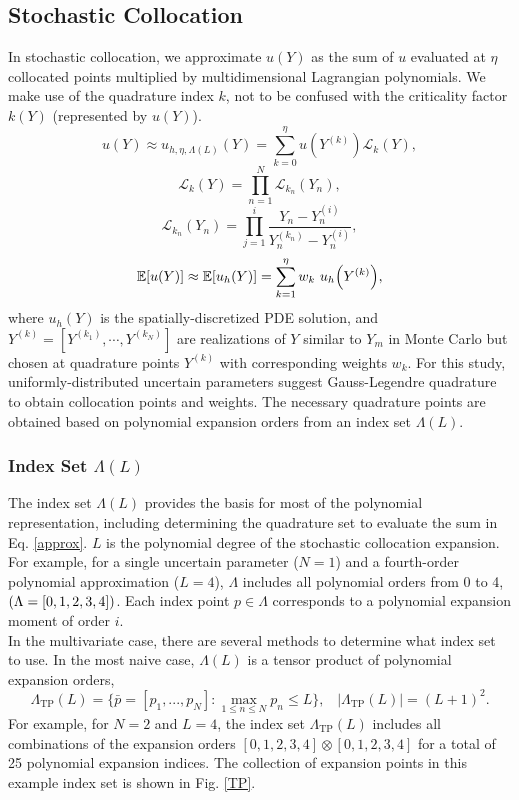 \documentclass{mc2015}
\newcommand{\expv}[1]{\ensuremath{\mathbb{E}[ #1]}}
\begin{document}
\subsection{Stochastic Collocation}
In stochastic collocation, we approximate $u(Y)$ as the sum of $u$ evaluated at $\eta$ collocated points multiplied by multidimensional Lagrangian polynomials.  We make use of the quadrature index $k$, not to be confused with the criticality factor $k(Y)$ (represented by $u(Y)$).
\begin{equation}\label{approx}
u(Y)\approx u_{h,\eta,\Lambda(L)}(Y)=\sum_{k=0}^\eta u(Y^{(k)})\mathcal{L}_k(Y),
\end{equation}
\begin{equation}
\mathcal{L}_k(Y)=\prod_{n=1}^N \mathcal{L}_{k_n}(Y_n),
\end{equation}
\begin{equation}
\mathcal{L}_{k_n}(Y_n)=\prod_{j=1}^i \frac{Y_n-Y_n^{(i)}}{Y_n^{(k_n)}-Y_n^{(i)}},
\end{equation}
\begin{equation}
\expv{u(Y)}\approx\expv{u_h(Y)}=\sum_{k=1}^\eta w_k ~u_h\qty(Y^{(k)}),
\end{equation}
where $u_h(Y)$ is the spatially-discretized PDE solution, and $Y^{(k)}=[Y^{(k_1)},\cdots,Y^{(k_N)}]$ are realizations of $Y$ similar to $Y_m$ in Monte Carlo but chosen at quadrature points $Y^{(k)}$ with corresponding weights $w_k$.  For this study, uniformly-distributed uncertain parameters suggest Gauss-Legendre quadrature to obtain collocation points and weights.  The necessary quadrature points are obtained based on polynomial expansion orders from an index set $\Lambda(L)$.

\subsubsection{Index Set $\Lambda(L)$}
The index set $\Lambda(L)$ provides the basis for most of the polynomial representation, including determining the quadrature set to evaluate the sum in Eq. \ref{approx}.  $L$ is the polynomial degree of the stochastic collocation expansion.  For example, for a single uncertain parameter ($N=1$) and a fourth-order polynomial approximation ($L=4$), $\Lambda$ includes all polynomial orders from 0 to 4, $\qty(\Lambda=[0,1,2,3,4])$.  Each index point $p\in\Lambda$ corresponds to a polynomial expansion moment of order $i$.\\

In the multivariate case, there are several methods to determine what index set to use.
In the most naive case, $\Lambda(L)$ is a tensor product of polynomial expansion orders,
\begin{equation}
\Lambda_\text{TP}(L)=\Big\{\bar p=[p_1,...,p_N]: \max_{1\leq n\leq N}p_n\leq L \Big\},\hspace{10pt}|\Lambda_\text{TP}(L)|=(L+1)^2.
\end{equation}
For example, for $N=2$ and $L=4$, the index set $\Lambda_\text{TP}(L)$ includes all combinations of the expansion orders $[0,1,2,3,4]\otimes[0,1,2,3,4]$ for a total of 25 polynomial expansion indices.  The collection of expansion points in this example index set is shown in Fig. \ref{TP}.  \\
\end{document}

